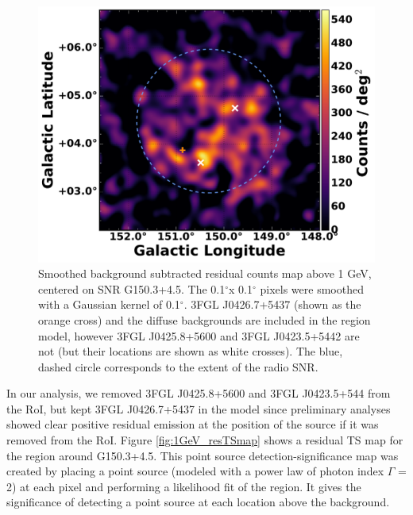 \documentclass[iop]{emulateapj}
\newcommand{\gam}{$\gamma$-ray}
\newcommand{\Gone}{G150.3+4.5}
\newcommand{\psrLike}{3FGL J0426.7+5437}
\begin{document}
\begin{figure}[!ht]
	\begin{centering}
		\includegraphics[width=1.\columnwidth]{Figures/G150_1GeV_source_w3FGL_noLabs.pdf}
		\caption[Smoothed background subtracted residual counts map above 1 GeV for \Gone{}]{Smoothed background subtracted residual counts map above 1 GeV, centered on SNR \Gone. The 0.1$^\circ$x 0.1$^\circ$ pixels were smoothed with a Gaussian kernel of 0.1$^\circ$. \psrLike{} (shown as the orange cross) and the diffuse backgrounds are included in the region model, however 3FGL J0425.8+5600 and 3FGL J0423.5+5442 are not (but their locations are shown as white crosses). The blue, dashed circle corresponds to the extent of the radio SNR.  %
			\label{fig:1GeV_cmaps}}
	\end{centering}
\end{figure}

In our analysis, we removed 3FGL J0425.8+5600 and 3FGL J0423.5+544 from the RoI, but kept \psrLike{} in the model since preliminary analyses showed clear positive residual emission at the position of the source if it was removed from the RoI. Figure \ref{fig:1GeV_resTSmap} shows a residual TS map for the region around \Gone. This point source detection-significance map was created by placing a point source (modeled with a power law of photon index $\Gamma$ = 2) at each pixel and performing a likelihood fit of the region. It gives the significance of detecting a point source at each location above the background. 
\end{document}
